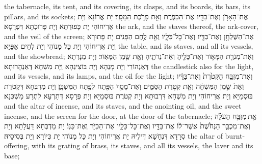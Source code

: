 {the tabernacle, its tent, and its covering, its clasps, and its boards, its bars, its pillars, and its sockets;}{}
{אֶת־הָאָרֹ֥ן וְאֶת־בַּדָּ֖יו אֶת־הַכַּפֹּ֑רֶת וְאֵ֖ת פָּרֹ֥כֶת הַמָּסָֽךְ׃
}
{יָת אֲרוֹנָא וְיָת אֲרִיחוֹהִי יָת כָּפוּרְתָּא וְיָת פָּרוּכְתָּא דִּפְרָסָא׃}
{the ark, and the staves thereof, the ark-cover, and the veil of the screen;}{}
{אֶת־הַשֻּׁלְחָ֥ן וְאֶת־בַּדָּ֖יו וְאֶת־כׇּל־כֵּלָ֑יו וְאֵ֖ת לֶ֥חֶם הַפָּנִֽים׃
}
{יָת פָּתוּרָא וְיָת אֲרִיחוֹהִי וְיָת כָּל מָנוֹהִי וְיָת לְחֵים אַפַּיָּא׃}
{the table, and its staves, and all its vessels, and the showbread;}{}
{וְאֶת־מְנֹרַ֧ת הַמָּא֛וֹר וְאֶת־כֵּלֶ֖יהָ וְאֶת־נֵרֹתֶ֑יהָ וְאֵ֖ת שֶׁ֥מֶן הַמָּאֽוֹר׃
}
{וְיָת מְנָרְתָא דְּאַנְהוֹרִי וְיָת מָנַהָא וְיָת בּוֹצִינַהָא וְיָת מִשְׁחָא דְּאַנְהָרוּתָא׃}
{the candlestick also for the light, and its vessels, and its lamps, and the oil for the light;}{}
{וְאֶת־מִזְבַּ֤ח הַקְּטֹ֙רֶת֙ וְאֶת־בַּדָּ֔יו וְאֵת֙ שֶׁ֣מֶן הַמִּשְׁחָ֔ה וְאֵ֖ת קְטֹ֣רֶת הַסַּמִּ֑ים וְאֶת־מָסַ֥ךְ הַפֶּ֖תַח לְפֶ֥תַח הַמִּשְׁכָּֽן׃
}
{וְיָת מַדְבְּחָא דִּקְטֹרֶת בּוּסְמַיָּא וְיָת אֲרִיחוֹהִי וְיָת מִשְׁחָא דִּרְבוּתָא וְיָת קְטֹרֶת בּוּסְמַיָּא וְיָת פְּרָסָא דְּתַרְעָא לִתְרַע מַשְׁכְּנָא׃}
{and the altar of incense, and its staves, and the anointing oil, and the sweet incense, and the screen for the door, at the door of the tabernacle;}{}
{אֵ֣ת \legarmeh  מִזְבַּ֣ח הָעֹלָ֗ה וְאֶת־מִכְבַּ֤ר הַנְּחֹ֙שֶׁת֙ אֲשֶׁר־ל֔וֹ אֶת־בַּדָּ֖יו וְאֶת־כׇּל־כֵּלָ֑יו אֶת־הַכִּיֹּ֖ר וְאֶת־כַּנּֽוֹ׃}
{יָת מַדְבְּחָא דַּעֲלָתָא וְיָת סְרָדָא דִּנְחָשָׁא דִּילֵיהּ יָת אֲרִיחוֹהִי וְיָת כָּל מָנוֹהִי יָת כִּיּוֹרָא וְיָת בְּסִיסֵיהּ׃}
{the altar of burnt-offering, with its grating of brass, its staves, and all its vessels, the laver and its base;}{}
